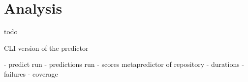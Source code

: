 
\section{Analysis}
todo

CLI version of the predictor

- predict run
- predictions run
- scores metapredictor of repository
- durations
- failures
- coverage 